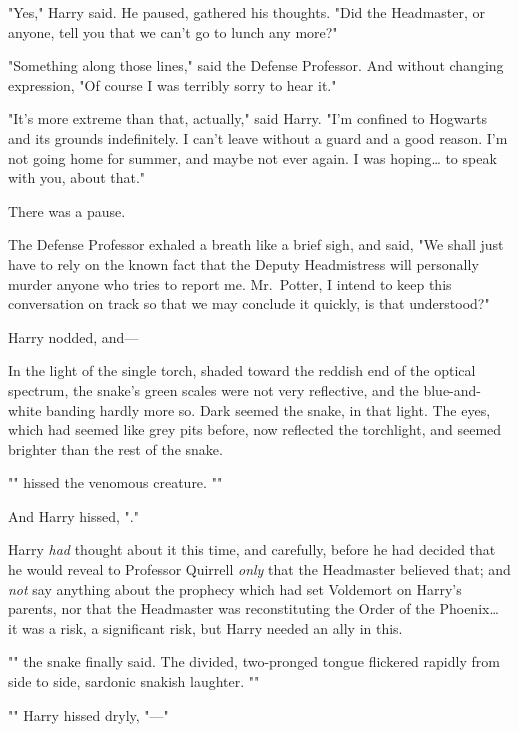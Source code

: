 "Yes," Harry said. He paused, gathered his thoughts. "Did the Headmaster, or
anyone, tell you that we can't go to lunch any more?"

"Something along those lines," said the Defense Professor. And without changing
expression, "Of course I was terribly sorry to hear it."

"It's more extreme than that, actually," said Harry. "I'm confined to Hogwarts
and its grounds indefinitely. I can't leave without a guard and a good reason.
I'm not going home for summer, and maybe not ever again. I was hoping{\ldots}
to speak with you, about that."

There was a pause.

The Defense Professor exhaled a breath like a brief sigh, and said, "We shall
just have to rely on the known fact that the Deputy Headmistress will
personally murder anyone who tries to report me. Mr.~Potter, I intend to keep
this conversation on track so that we may conclude it quickly, is that
understood?"

Harry nodded, and---

In the light of the single torch, shaded toward the reddish end of the optical
spectrum, the snake's green scales were not very reflective, and the
blue-and-white banding hardly more so. Dark seemed the snake, in that light.
The eyes, which had seemed like grey pits before, now reflected the torchlight,
and seemed brighter than the rest of the snake.

"" hissed the venomous creature. ""

And Harry hissed, "."

Harry \emph{had} thought about it this time, and carefully, before he had
decided that he would reveal to Professor Quirrell \emph{only} that the
Headmaster believed that; and \emph{not} say anything about the prophecy which
had set Voldemort on Harry's parents, nor that the Headmaster was
reconstituting the Order of the Phoenix{\ldots} it was a risk, a significant
risk, but Harry needed an ally in this.

"" the snake finally said. The divided,
two-pronged tongue flickered rapidly from side to side, sardonic snakish
laughter. ""

"" Harry hissed dryly, "---"

